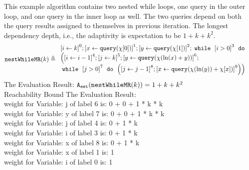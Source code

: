         \begin{example}
            \label{ex:nestedWhileMR}
            This example algorithm contains two nested while loops, one query in the outer loop, and one query in the inner loop as well.
            The two queries depend on both the query results assigned to themselves in previous iteration.
            The longest dependency depth, i.e., the adaptivity is expectation to be $1 + k + k^2 $.
            \[
            \kw{nestWhileMR}(k) \triangleq 
            \begin{array}{l}
                \clabel{\assign{i}{k} }^{0} ; 
                \clabel{ \assign{x}{\query(\chi[0])}}^{1} ; 
                \clabel{ \assign{y}{\query(\chi[1])}}^{2} ; 
                \ewhile ~ \clabel{i > 0}^{3} ~ \edo ~ \\
                \Big(
                \clabel{\assign{i}{i-1}}^{4} ;
                \clabel{\assign{j}{k}}^{5} ;
                \clabel{\assign{y}{\query(\chi(\ln(x) + y))} }^{6}  ; \\
                \ewhile ~ \clabel{j > 0}^{7} ~ \edo ~ 
                \Big(
                \clabel{\assign{j}{j-1}}^{8};
                \clabel{\assign{x}{\query(\chi(\ln(y))+\chi[x])} }^{9}
                \Big) \Big)
            \end{array}
            \]
            The Evaluation Result: 
            $ {\mathtt{A_{est}}}(\mathtt{nestWhileMR}(k)) = 1 + k + k^2$
            \\
            Reachability Bound The Evaluation Result: \\
            weight for Variable: j of label 6 is: 0 + 0 + 1 * k * k\\
            weight for Variable: y of label 7 is: 0 + 0 + 1 * k * k\\
            weight for Variable: j of label 4 is: 0 + 1 * k\\
            weight for Variable: i of label 3 is: 0 + 1 * k\\
            weight for Variable: x of label 8 is: 0 + 1 * k\\
            weight for Variable: x of label 1 is: 1\\
            weight for Variable: i of label 0 is: 1\\
            \end{example}
